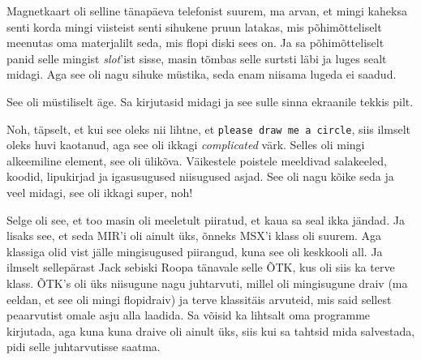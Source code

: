 
Magnetkaart oli selline  tänapäeva  telefonist suurem, ma arvan, et mingi kaheksa senti korda mingi viisteist senti sihukene pruun latakas, mis põhimõtteliselt meenutas oma materjalilt seda, mis flopi diski sees on. Ja sa põhimõtteliselt panid selle mingist \emph{slot}'ist sisse, masin tõmbas selle surtsti läbi ja luges sealt midagi. Aga see oli nagu sihuke müstika, seda enam niisama lugeda ei saadud. 


See oli  müstiliselt äge. Sa kirjutasid midagi ja see  sulle  sinna ekraanile tekkis pilt.


Noh, täpselt, et kui see oleks nii lihtne, et \verb|please draw me a circle|, siis  ilmselt oleks huvi kaotanud, aga see oli ikkagi \emph{complicated} värk. Selles oli mingi alkeemiline element, see oli ülikõva. Väikestele poistele meeldivad salakeeled, koodid, lipukirjad ja igasusugused niisugused asjad. See  oli nagu kõike seda  ja veel midagi,  see oli ikkagi super, noh!

Selge oli see, et too masin oli  meeletult piiratud, et kaua sa seal ikka jändad. Ja lisaks see, et seda MIR'i oli ainult üks, õnneks MSX'i klass oli suurem. Aga klassiga olid vist jälle mingisugused piirangud, kuna see oli keskkooli all. Ja ilmselt sellepärast Jack sebiski Roopa tänavale selle ÕTK, kus oli siis ka terve klass. ÕTK's oli  üks niisugune nagu juhtarvuti, millel oli mingisugune draiv (ma eeldan, et see oli mingi flopidraiv) ja terve klassitäis arvuteid, mis said sellest peaarvutist omale asju alla laadida. Sa võisid ka lihtsalt oma programme kirjutada, aga kuna kuna draive oli ainult üks, siis kui sa tahtsid mida salvestada, pidi selle juhtarvutisse saatma. 

